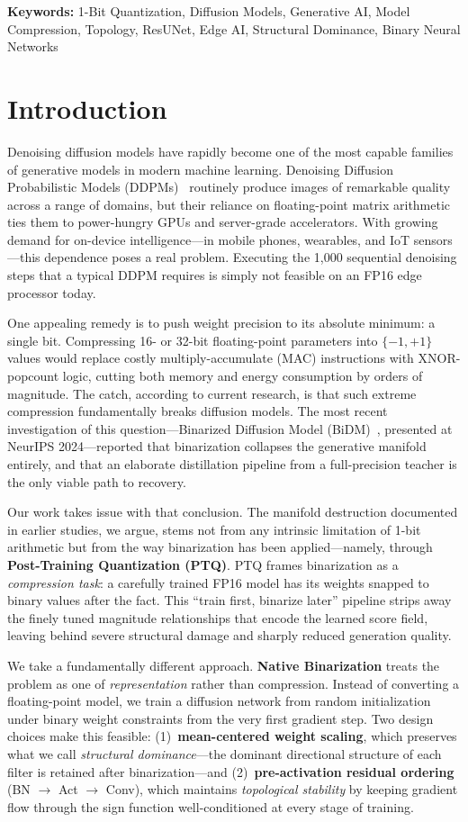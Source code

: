 \documentclass[twocolumn, journal]{IEEEtran}
\begin{document}
\noindent\textbf{Keywords:} 1-Bit Quantization, Diffusion Models, Generative AI, Model Compression, Topology,
ResUNet, Edge AI, Structural Dominance, Binary Neural Networks

\section{Introduction}

Denoising diffusion models have rapidly become one of the most capable families of
generative models in modern machine learning. Denoising Diffusion Probabilistic Models
(DDPMs)~\cite{ho2020ddpm} routinely produce images of remarkable quality across a range
of domains, but their reliance on floating-point matrix arithmetic ties them to
power-hungry GPUs and server-grade accelerators. With growing demand for on-device
intelligence---in mobile phones, wearables, and IoT sensors---this dependence poses a
real problem. Executing the 1{,}000 sequential denoising steps that a typical DDPM
requires is simply not feasible on an FP16 edge processor today.

One appealing remedy is to push weight precision to its absolute minimum: a single bit.
Compressing 16- or 32-bit floating-point parameters into $\{-1,+1\}$ values would
replace costly multiply-accumulate (MAC) instructions with XNOR-popcount logic, cutting
both memory and energy consumption by orders of magnitude. The catch, according to
current research, is that such extreme compression fundamentally breaks diffusion
models. The most recent investigation of this question---Binarized Diffusion Model
(BiDM)~\cite{bidm2024}, presented at NeurIPS 2024---reported that binarization
collapses the generative manifold entirely, and that an elaborate distillation pipeline
from a full-precision teacher is the only viable path to recovery.

Our work takes issue with that conclusion. The manifold destruction documented in
earlier studies, we argue, stems not from any intrinsic limitation of 1-bit
arithmetic but from the way binarization has been applied---namely, through
\textbf{Post-Training Quantization (PTQ)}. PTQ frames binarization as a
\emph{compression task}: a carefully trained FP16 model has its weights snapped to
binary values after the fact. This ``train first, binarize later'' pipeline strips
away the finely tuned magnitude relationships that encode the learned score field,
leaving behind severe structural damage and sharply reduced generation quality.

We take a fundamentally different approach.  \textbf{Native Binarization} treats the
problem as one of \emph{representation} rather than compression. Instead of converting
a floating-point model, we train a diffusion network from random initialization under
binary weight constraints from the very first gradient step. Two design choices make
this feasible: (1)~\textbf{mean-centered weight scaling}, which preserves what we call
\emph{structural dominance}---the dominant directional structure of each filter is
retained after binarization---and (2)~\textbf{pre-activation residual ordering}
(BN $\to$ Act $\to$ Conv), which maintains \emph{topological stability} by keeping
gradient flow through the sign function well-conditioned at every stage of training.
\end{document}
